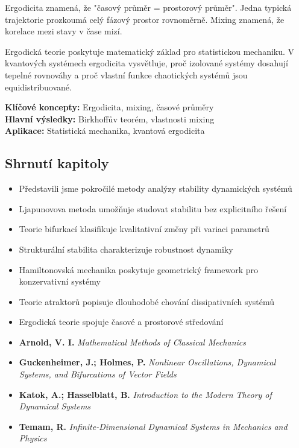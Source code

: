 \begin{intuition}
Ergodicita znamená, že "časový průměr = prostorový průměr". Jedna typická trajektorie prozkoumá celý fázový prostor rovnoměrně. Mixing znamená, že korelace mezi stavy v čase mizí.
\end{intuition}

\begin{keyinsight}
Ergodická teorie poskytuje matematický základ pro statistickou mechaniku. V kvantových systémech ergodicita vysvětluje, proč izolované systémy dosahují tepelné rovnováhy a proč vlastní funkce chaotických systémů jsou equidistribuované.
\end{keyinsight}

\begin{summary}
\textbf{Klíčové koncepty:} Ergodicita, mixing, časové průměry \\
\textbf{Hlavní výsledky:} Birkhoffův teorém, vlastnosti mixing \\
\textbf{Aplikace:} Statistická mechanika, kvantová ergodicita
\end{summary}

\spc

\subsection*{Shrnutí kapitoly}

\begin{itemize}
\item Představili jsme pokročilé metody analýzy stability dynamických systémů
\item Ljapunovova metoda umožňuje studovat stabilitu bez explicitního řešení
\item Teorie bifurkací klasifikuje kvalitativní změny při variaci parametrů
\item Strukturální stabilita charakterizuje robustnost dynamiky
\item Hamiltonovská mechanika poskytuje geometrický framework pro konzervativní systémy
\item Teorie atraktorů popisuje dlouhodobé chování dissipativních systémů
\item Ergodická teorie spojuje časové a prostorové středování
\end{itemize}

\vspace{0.5cm}

\begin{tcolorbox}[title=\textbf{Doporučená literatura}, colback=blue!5!white, colframe=blue!75!black]
\begin{itemize}
\item \textbf{Arnold, V. I.} \emph{Mathematical Methods of Classical Mechanics}
\item \textbf{Guckenheimer, J.; Holmes, P.} \emph{Nonlinear Oscillations, Dynamical Systems, and Bifurcations of Vector Fields}  
\item \textbf{Katok, A.; Hasselblatt, B.} \emph{Introduction to the Modern Theory of Dynamical Systems}
\item \textbf{Temam, R.} \emph{Infinite-Dimensional Dynamical Systems in Mechanics and Physics}
\end{itemize}
\end{tcolorbox}

